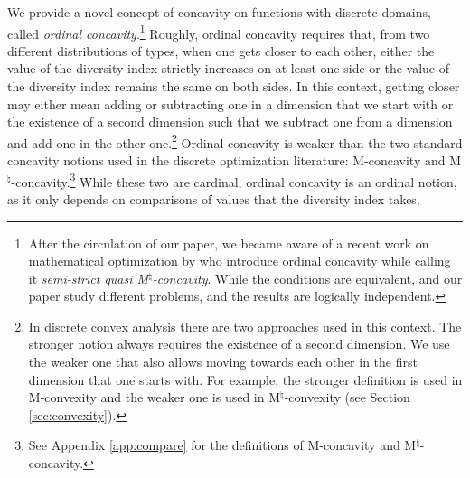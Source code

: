 \documentclass[12pt]{amsart}
\theoremstyle{remark}
\begin{document}
We provide a novel concept of concavity on functions with discrete domains, called
\emph{ordinal concavity}.\footnote{\label{IP-footnote}After the circulation of our paper, we became aware
of a recent work on mathematical optimization by \cite{chenli2020} who introduce
ordinal concavity while calling it \emph{semi-strict quasi M}$^{\natural}$\emph{-concavity}. While the conditions are equivalent, \cite{chenli2020} and our paper study different problems, and the results are logically independent.} Roughly, ordinal concavity requires that, from two different distributions of types, when one gets closer to each other, either the value of the diversity
index strictly increases on at least one side or the value of the diversity
index remains the same on both sides. In this context, getting closer may either mean
adding or subtracting one in a dimension that we start with or the
existence of a second dimension such that we subtract one from a
dimension and add one in the other one.\footnote{In discrete convex analysis there are two approaches used in this context.
The stronger notion always requires the existence of a second dimension. We use the weaker one
that also allows moving towards each other in the first dimension that one starts with. For example, the stronger definition is used in M-convexity and
the weaker one is used in M$^{\natural}$-convexity (see Section \ref{sec:convexity}).} Ordinal concavity is weaker than the two standard concavity notions used in
the discrete optimization literature: M-concavity and
M$^{\natural}$-concavity.\footnote{See Appendix \ref{app:compare} for the definitions of M-concavity and M$^{\natural}$-concavity.} While these two are cardinal, ordinal concavity is an ordinal notion, as it only depends on comparisons of values that the diversity index takes.
\end{document}
